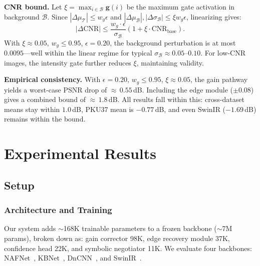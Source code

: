 \documentclass[journal,twoside,web]{ieeecolor}
\begin{document}
\textbf{CNR bound.} Let $\xi = \max_{i \in \mathcal{B}} \mathbf{g}(i)$ be the maximum gate activation in background $\mathcal{B}$. Since $|\Delta\mu_\mathcal{T}| \leq w_g \epsilon$ and $|\Delta\mu_\mathcal{B}|, |\Delta\sigma_\mathcal{B}| \leq \xi w_g \epsilon$, linearizing gives:
\begin{equation}
|\Delta\mathrm{CNR}| \leq \frac{w_g \cdot \epsilon}{\sigma_{\mathcal{B}}} \!\left(1 + \xi \cdot \mathrm{CNR}_{\mathrm{base}}\right).
\label{eq:cnr_bound}
\end{equation}
With $\xi \approx 0.05$, $w_g \leq 0.95$, $\epsilon = 0.20$, the background perturbation is at most $0.0095$---well within the linear regime for typical $\sigma_\mathcal{B} \approx 0.05$--$0.10$. For low-CNR images, the intensity gate further reduces $\xi$, maintaining validity.

\textbf{Empirical consistency.} With $\epsilon = 0.20$, $w_g \leq 0.95$, $\xi \approx 0.05$, the gain pathway yields a worst-case PSNR drop of ${\approx}\,0.55$\,dB. Including the edge module ($\pm 0.08$) gives a combined bound of ${\approx}\,1.8$\,dB. All results fall within this: cross-dataset means stay within $1.0$\,dB, PKU37 mean is $-0.77$\,dB, and even SwinIR ($-1.69$\,dB) remains within the bound.

\section{Experimental Results}
\label{sec:experiments}

\subsection{Setup}
\label{sec:setup}

\subsubsection{Architecture and Training}
Our system adds ${\sim}$168K trainable parameters to a frozen backbone (${\sim}$7M params), broken down as: gain corrector 98K, edge recovery module 37K, confidence head 22K, and symbolic negotiator 11K. We evaluate four backbones: NAFNet~\cite{chen2022simple}, KBNet~\cite{zhang2023kbnet}, DnCNN~\cite{zhang2017beyond}, and SwinIR~\cite{liang2021swinir}.
\end{document}
